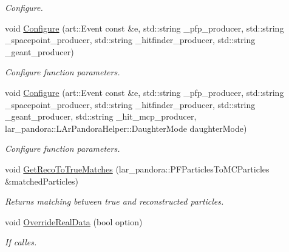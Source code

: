 \begin{DoxyCompactItemize}
\begin{DoxyCompactList}\small\item\em Configure. \end{DoxyCompactList}\item 
void \hyperlink{classubana_1_1McPfpMatch_a0f07649a58ade64a2a127846231cd7c8}{Configure} (art\-::\-Event const \&e, std\-::string \-\_\-pfp\-\_\-producer, std\-::string \-\_\-spacepoint\-\_\-producer, std\-::string \-\_\-hitfinder\-\_\-producer, std\-::string \-\_\-geant\-\_\-producer)
\begin{DoxyCompactList}\small\item\em Configure function parameters. \end{DoxyCompactList}\item 
void \hyperlink{classubana_1_1McPfpMatch_af0f60c86d087ee5c99a73170cf03b200}{Configure} (art\-::\-Event const \&e, std\-::string \-\_\-pfp\-\_\-producer, std\-::string \-\_\-spacepoint\-\_\-producer, std\-::string \-\_\-hitfinder\-\_\-producer, std\-::string \-\_\-geant\-\_\-producer, std\-::string \-\_\-hit\-\_\-mcp\-\_\-producer, lar\-\_\-pandora\-::\-L\-Ar\-Pandora\-Helper\-::\-Daughter\-Mode daughter\-Mode)
\begin{DoxyCompactList}\small\item\em Configure function parameters. \end{DoxyCompactList}\item 
void \hyperlink{classubana_1_1McPfpMatch_a44436a82315246fb67b42f8542fb327c}{Get\-Reco\-To\-True\-Matches} (lar\-\_\-pandora\-::\-P\-F\-Particles\-To\-M\-C\-Particles \&matched\-Particles)
\begin{DoxyCompactList}\small\item\em Returns matching between true and reconstructed particles. \end{DoxyCompactList}\item 
void \hyperlink{classubana_1_1McPfpMatch_ac998d64cc35ba464976eafe6a1543274}{Override\-Real\-Data} (bool option)
\begin{DoxyCompactList}\small\item\em If calles. \end{DoxyCompactList}\end{DoxyCompactItemize}
